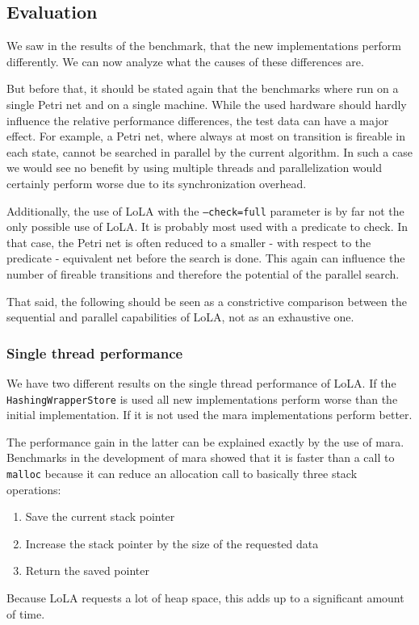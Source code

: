 \subsection{Evaluation}
\label{evaluation}
We saw in the results of the benchmark, that the new implementations perform differently. We can now analyze what the causes of these differences are.

But before that, it should be stated again that the benchmarks where run on a single Petri net and on a single machine. While the used hardware should hardly influence the relative performance differences, the test data can have a major effect. For example, a Petri net, where always at most on transition is fireable in each state, cannot be searched in parallel by the current algorithm. In such a case we would see no benefit by using multiple threads and parallelization would certainly perform worse due to its synchronization overhead.

Additionally, the use of LoLA with the \texttt{--check=full} parameter is by far not the only possible use of LoLA. It is probably most used with a predicate to check. In that case, the Petri net is often reduced to a smaller - with respect to the predicate - equivalent net before the search is done. This again can influence the number of fireable transitions and therefore the potential of the parallel search.

That said, the following should be seen as a constrictive comparison between the sequential and parallel capabilities of LoLA, not as an exhaustive one.

\subsubsection{Single thread performance}
\label{evalSingleThread}
We have two different results on the single thread performance of LoLA. If the \texttt{Hashing\-Wrapper\-Store} is used all new implementations perform worse than the initial implementation. If it is not used the mara implementations perform better.

The performance gain in the latter can be explained exactly by the use of mara. Benchmarks in the development of mara showed that it is faster than a call to \texttt{malloc} because it can reduce an allocation call to basically three stack operations:
\begin{enumerate}
    \item Save the current stack pointer
    \item Increase the stack pointer by the size of the requested data
    \item Return the saved pointer
\end{enumerate}
Because LoLA requests a lot of heap space, this adds up to a significant amount of time.

